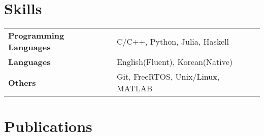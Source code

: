 \documentclass[letterpaper,10pt]{article}
\begin{document}

{\selectfont
\section{Skills}
}
\vspace{-2.5mm}
\begin{tabularx}{\linewidth}{@{}l X@{}}
\textbf{Programming Languages} &  \normalsize{C/C++, Python, Julia, Haskell}\\
\textbf{Languages}  &  \normalsize{English(Fluent), Korean(Native)}\\
\textbf{Others}  &  \normalsize{Git, FreeRTOS, Unix/Linux, MATLAB}\\
\end{tabularx}

{\selectfont
\section{Publications}
}
\vspace{-2mm}
\begin{refsection}
\nocite{*}
\printbibliography[heading=none]
\end{refsection}

\vfill
{}
\end{document}
